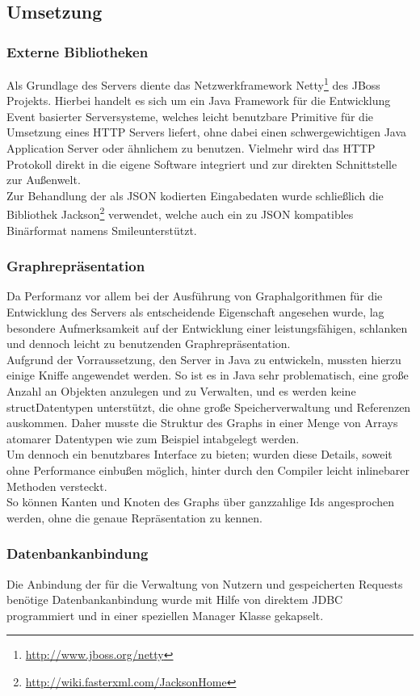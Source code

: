 \subsection*{Umsetzung}
\subsubsection*{Externe Bibliotheken}
Als Grundlage des Servers diente das Netzwerkframework Netty\footnote{\url{http://www.jboss.org/netty}} des JBoss Projekts. Hierbei handelt es sich um ein Java Framework für die Entwicklung Event basierter Serversysteme, welches leicht benutzbare Primitive für die Umsetzung eines HTTP Servers liefert, ohne dabei einen schwergewichtigen Java Application Server oder ähnlichem zu benutzen. Vielmehr wird das HTTP Protokoll direkt in die eigene Software integriert und zur direkten Schnittstelle zur Außenwelt.\\
Zur Behandlung der als JSON kodierten Eingabedaten wurde schließlich die Bibliothek Jackson\footnote{\url{http://wiki.fasterxml.com/JacksonHome}} verwendet, welche auch ein zu JSON kompatibles Binärformat namens \glqq Smile\grqq unterstützt.
\subsubsection*{Graphrepräsentation}
Da Performanz vor allem bei der Ausführung von Graphalgorithmen für die Entwicklung des Servers als entscheidende Eigenschaft angesehen wurde, lag besondere Aufmerksamkeit auf der Entwicklung einer leistungsfähigen, schlanken und dennoch leicht zu benutzenden Graphrepräsentation.\\
Aufgrund der Vorraussetzung, den Server in Java zu entwickeln, mussten hierzu einige Kniffe angewendet werden.
So ist es in Java sehr problematisch, eine große Anzahl an Objekten anzulegen und zu Verwalten, und es werden keine  \glqq struct\grqq Datentypen unterstützt, die ohne große Speicherverwaltung und Referenzen auskommen.
Daher musste die Struktur des Graphs in einer Menge von Arrays atomarer Datentypen wie zum Beispiel \glqq int\grqq abgelegt werden.\\
Um dennoch ein benutzbares Interface zu bieten; wurden diese Details, soweit ohne Performance einbußen möglich,  hinter durch den Compiler leicht inlinebarer Methoden versteckt.\\
So können Kanten und Knoten des Graphs über ganzzahlige Ids angesprochen werden, ohne die genaue Repräsentation zu kennen.
\subsubsection*{Datenbankanbindung}
Die Anbindung der für die Verwaltung von Nutzern und gespeicherten Requests benötige Datenbankanbindung wurde mit Hilfe von direktem JDBC programmiert und in einer speziellen Manager Klasse gekapselt.
